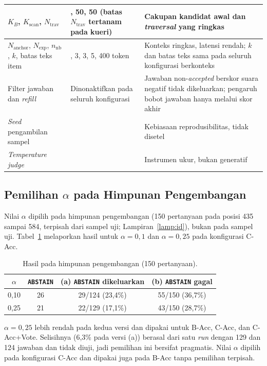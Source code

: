 \begin{table}[!htbp]
\begin{tabularx}{\textwidth}{|>{\raggedright\arraybackslash}p{3.6cm}|>{\raggedright\arraybackslash}p{2.6cm}|>{\raggedright\arraybackslash}X|}
\hline
$K_B$, $K_{\mathrm{scan}}$, $N_{\mathrm{trav}}$ & 10, 50, 50 (batas $N_{\mathrm{trav}}$ tertanam pada kueri) & Cakupan kandidat awal dan \emph{traversal} yang ringkas \\
\hline
$N_{\mathrm{anchor}}$, $N_{\mathrm{exp}}$, $n_{\mathrm{nb}}$, $k$, batas teks item & 3, 3, 3, 5, 400 token & Konteks ringkas, latensi rendah; $k$ dan batas teks sama pada seluruh konfigurasi berkonteks \\
\hline
Filter jawaban dan \emph{refill} & Dinonaktifkan pada seluruh konfigurasi & Jawaban non-\emph{accepted} berskor suara negatif tidak dikeluarkan; pengaruh bobot jawaban hanya melalui skor akhir \\
\hline
\emph{Seed} pengambilan sampel & 42 & Kebiasaan reprodusibilitas, tidak disetel \\
\hline
\emph{Temperature judge} & 0 & Instrumen ukur, bukan generatif \\
\hline
\end{tabularx}
\end{table}

\subsection{Pemilihan $\alpha$ pada Himpunan Pengembangan}
\label{subsec:pemilihan-alpha}

Nilai $\alpha$ dipilih pada himpunan pengembangan (150 pertanyaan pada posisi 435 sampai 584, terpisah dari sampel uji; Lampiran~\ref{lamp:id}), bukan pada sampel uji. Tabel~\ref{tab:alpha-dev} melaporkan hasil untuk $\alpha=0{,}1$ dan $\alpha=0{,}25$ pada konfigurasi C-Acc.

\begin{table}[!htbp]
\centering
\small
\caption{Hasil pada himpunan pengembangan (150 pertanyaan).}
\label{tab:alpha-dev}
\renewcommand{\arraystretch}{1.2}
\begin{tabular}{|c|c|c|c|}
\hline
\textbf{$\alpha$} & \textbf{\texttt{ABSTAIN}} & \textbf{(a) \texttt{ABSTAIN} dikeluarkan} & \textbf{(b) \texttt{ABSTAIN} gagal} \\
\hline
0,10 & 26 & 29/124 (23,4\%) & 55/150 (36,7\%) \\
0,25 & 21 & 22/129 (17,1\%) & 43/150 (28,7\%) \\
\hline
\end{tabular}
\end{table}

$\alpha=0{,}25$ lebih rendah pada kedua versi dan dipakai untuk B-Acc, C-Acc, dan C-Acc+Vote. Selisihnya (6,3\% pada versi (a)) berasal dari satu \emph{run} dengan 129 dan 124 jawaban dan tidak diuji, jadi pemilihan ini bersifat pragmatis. Nilai $\alpha$ dipilih pada konfigurasi C-Acc dan dipakai juga pada B-Acc tanpa pemilihan terpisah.

